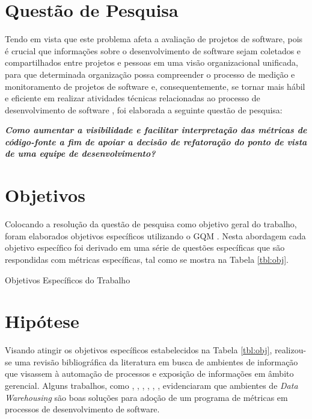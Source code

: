 
\section{Questão de Pesquisa}

Tendo em vista que este problema afeta a avaliação de projetos de software, pois é crucial que informações sobre o desenvolvimento de software sejam coletados e compartilhados entre projetos e pessoas em uma visão organizacional unificada, para que determinada organização possa compreender o processo de medição e monitoramento de projetos de software e, consequentemente, se tornar mais hábil e eficiente em realizar atividades técnicas relacionadas ao processo de desenvolvimento de software \cite{Chulani2003}, foi elaborada a seguinte questão de pesquisa:

\textit{\textbf{Como aumentar a
visibilidade e facilitar interpretação das 
métricas de código-fonte
a fim de apoiar a decisão de refatoração
do ponto de vista de uma equipe de desenvolvimento?}}


\section{Objetivos}

Colocando a resolução da questão de pesquisa como objetivo geral do trabalho, foram elaborados objetivos específicos utilizando o GQM \cite{Basili96b}. Nesta abordagem cada objetivo específico foi derivado em uma série de questões específicas que são respondidas com métricas específicas, tal como se mostra na Tabela \ref{tbl:obj}. 

\begin{table}
\centering

\caption{Objetivos Específicos do Trabalho}
\label{tbl:obj} 
\end{table}
\FloatBarrier

\section{Hipótese}

Visando atingir os objetivos específicos estabelecidos na Tabela \ref{tbl:obj}, realizou-se uma revisão bibliográfica da literatura em busca de ambientes de informação que visassem à automação de processos e exposição de informações em âmbito gerencial.
Alguns trabalhos, como , , , , , , evidenciaram que ambientes de \textit{Data Warehousing} são boas soluções para adoção de um programa de métricas em processos de desenvolvimento de software.

